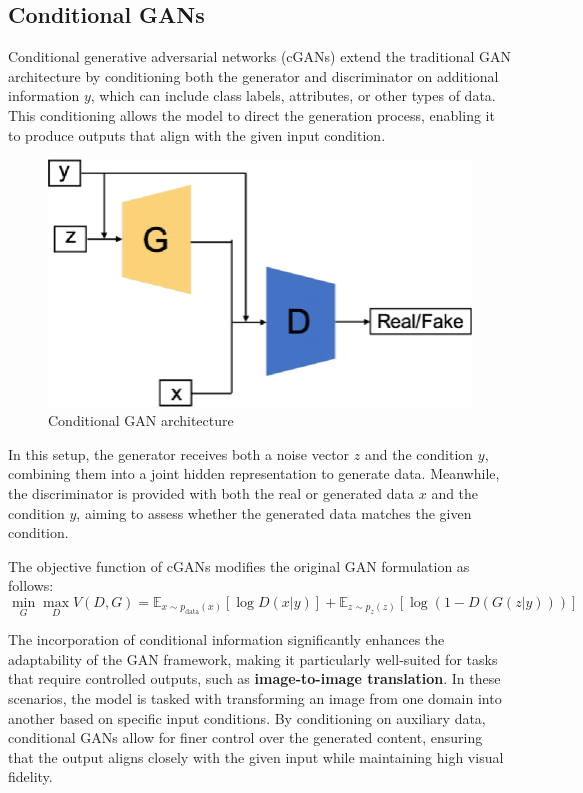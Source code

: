 \documentclass[12pt,DIV14,BCOR12mm,a4paper,footinclude=false,headinclude,parskip=half-,twoside,openright,cleardoublepage=empty,toc=index,bibliography=totoc,listof=totoc]{scrreprt}
\numberwithin{equation}{chapter}
\begin{document}
\subsection{Conditional GANs}
Conditional generative adversarial networks (cGANs) extend the traditional GAN architecture by conditioning both the generator and discriminator on additional information \( y \), which can include class labels, attributes, or other types of data. This conditioning allows the model to direct the generation process, enabling it to produce outputs that align with the given input condition. 
\begin{figure}
	\centering
	\includegraphics[scale=.9]{../media/Conditional-GAN-architecture.png}
	\caption{Conditional GAN architecture\cite{unknown}}
	\label{cGAN}
\end{figure}
In this setup, the generator receives both a noise vector \( z \) and the condition \( y \), combining them into a joint hidden representation to generate data. Meanwhile, the discriminator is provided with both the real or generated data \( x \) and the condition \( y \), aiming to assess whether the generated data matches the given condition.

The objective function of cGANs modifies the original GAN formulation as follows:
\begin{equation}
\min_{G} \max_{D} V(D, G) = \mathbb{E}_{x \sim p_{\text{data}}(x)} [\log D(x|y)] + \mathbb{E}_{z \sim p_z(z)} [\log(1 - D(G(z|y)))]
\end{equation}

The incorporation of conditional information significantly enhances the adaptability of the GAN framework, making it particularly well-suited for tasks that require controlled outputs, such as \textbf{image-to-image translation}. In these scenarios, the model is tasked with transforming an image from one domain into another based on specific input conditions. By conditioning on auxiliary data, conditional GANs allow for finer control over the generated content, ensuring that the output aligns closely with the given input while maintaining high visual fidelity.
\end{document}
